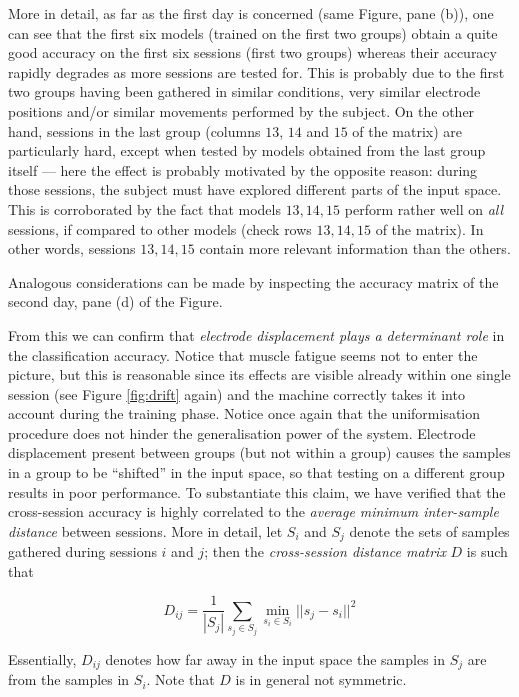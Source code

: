 More in detail, as far as the first day is concerned (same Figure,
pane (b)), one can see that the first six models (trained on the
first two groups) obtain a quite good accuracy on the first six
sessions (first two groups) whereas their accuracy rapidly degrades as
more sessions are tested for. This is probably due to the first two
groups having been gathered in similar conditions, very similar
electrode positions and/or similar movements performed by the
subject. On the other hand, sessions in the last group (columns $13$,
$14$ and $15$ of the matrix) are particularly hard, except when tested
by models obtained from the last group itself --- here the effect is
probably motivated by the opposite reason: during those sessions, the
subject must have explored different parts of the input space. This is
corroborated by the fact that models $13,14,15$ perform rather well on
\emph{all} sessions, if compared to other models (check rows
$13,14,15$ of the matrix). In other words, sessions $13,14,15$ contain
more relevant information than the others.

Analogous considerations can be made by inspecting the accuracy matrix
of the second day, pane (d) of the Figure.

From this we can confirm that \emph{electrode displacement plays a
determinant role} in the classification accuracy. Notice that muscle
fatigue seems not to enter the picture, but this is reasonable since
its effects are visible already within one single session (see Figure
\ref{fig:drift} again) and the machine correctly takes it into account
during the training phase. Notice once again that the uniformisation
procedure does not hinder the generalisation power of the
system. Electrode displacement present between groups (but not within
a group) causes the samples in a group to be ``shifted'' in the input
space, so that testing on a different group results in poor
performance. To substantiate this claim, we have verified that the
cross-session accuracy is highly correlated to the \emph{average
minimum inter-sample distance} between sessions. More in detail, let
$S_i$ and $S_j$ denote the sets of samples gathered during sessions
$i$ and $j$; then the \emph{cross-session distance matrix} $D$ is such
that

$$ D_{ij} = \frac{1}{|S_j|} \sum_{s_j \in S_j}{\min_{s_i \in S_i}{ ||s_j-s_i||^2 } } $$

Essentially, $D_{ij}$ denotes how far away in the input space the
samples in $S_j$ are from the samples in $S_i$. Note that $D$ is in
general not symmetric.

